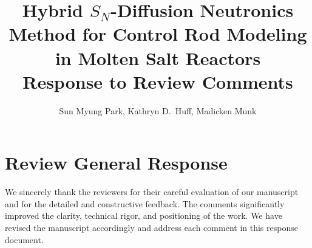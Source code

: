 \documentclass[answers,11pt]{exam}
\begin{document}


%

\title{Hybrid $S_N$-Diffusion Neutronics Method for Control Rod Modeling in
        Molten Salt Reactors\\
        \large Response to Review Comments}
\author{Sun Myung Park, Kathryn D.\ Huff, Madicken Munk}
\date{}



%
\maketitle
\section*{Review General Response}
We sincerely thank the reviewers for their careful evaluation of our manuscript and for the
detailed and constructive feedback. The comments significantly improved the clarity, technical
rigor, and positioning of the work. We have revised the manuscript accordingly and address each
comment in this response document.
\end{document}
